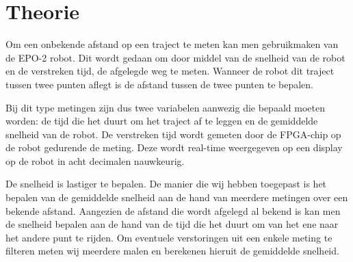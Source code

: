 \documentclass[a4paper,dutch]{article}
\begin{document}
\section{Theorie}

Om een onbekende afstand op een traject te meten kan men gebruikmaken van de EPO-2 robot. Dit wordt gedaan om door middel van de snelheid van de robot en de verstreken tijd, de afgelegde weg te meten. Wanneer de robot dit traject tussen twee punten aflegt is de afstand tussen de twee punten te bepalen.

Bij dit type metingen zijn dus twee variabelen aanwezig die bepaald moeten worden: de tijd die het duurt om het traject af te leggen en de gemiddelde snelheid van de robot. De verstreken tijd wordt gemeten door de FPGA-chip op de robot gedurende de meting. Deze wordt real-time weergegeven op een display op de robot in acht decimalen nauwkeurig.

De snelheid is lastiger te bepalen. De manier die wij hebben toegepast is het bepalen van de gemiddelde snelheid aan de hand van meerdere metingen over een bekende afstand. Aangezien de afstand die wordt afgelegd al bekend is kan men de snelheid bepalen aan de hand van de tijd die het duurt om van het ene naar het andere punt te rijden. Om eventuele verstoringen uit een enkele meting te filteren meten wij meerdere malen en berekenen hieruit de gemiddelde snelheid.
\end{document}
